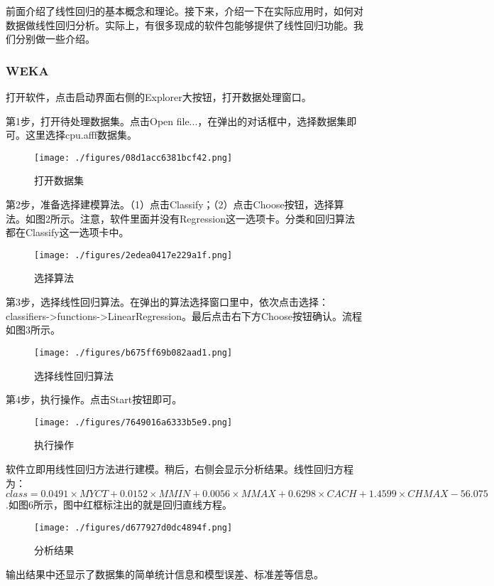 前面介绍了线性回归的基本概念和理论。接下来，介绍一下在实际应用时，如何对数据做线性回归分析。实际上，有很多现成的软件包能够提供了线性回归功能。我们分别做一些介绍。

\subsubsection{WEKA}


打开软件，点击启动界面右侧的Explorer大按钮，打开数据处理窗口。

第1步，打开待处理数据集。点击Open file...，在弹出的对话框中，选择数据集即可。这里选择cpu.afff数据集。
\begin{figure}[ht]
\centering
\texttt{[image: ./figures/08d1acc6381bcf42.png]}
\caption{打开数据集} \label{fig_LiGr_5}
\end{figure}

第2步，准备选择建模算法。（1）点击Classify；（2）点击Choose按钮，选择算法。如图2所示。注意，软件里面并没有Regression这一选项卡。分类和回归算法都在Classify这一选项卡中。
\begin{figure}[ht]
\centering
\texttt{[image: ./figures/2edea0417e229a1f.png]}
\caption{选择算法} \label{fig_LiGr_2}
\end{figure}

第3步，选择线性回归算法。在弹出的算法选择窗口里中，依次点击选择：classifiers->functions->LinearRegression。最后点击右下方Choose按钮确认。流程如图3所示。
\begin{figure}[ht]
\centering
\texttt{[image: ./figures/b675ff69b082aad1.png]}
\caption{选择线性回归算法} \label{fig_LiGr_3}
\end{figure}

第4步，执行操作。点击Start按钮即可。
\begin{figure}[ht]
\centering
\texttt{[image: ./figures/7649016a6333b5e9.png]}
\caption{执行操作} \label{fig_LiGr_4}
\end{figure}

软件立即用线性回归方法进行建模。稍后，右侧会显示分析结果。线性回归方程为：$class=0.0491 \times MYCT+0.0152 \times MMIN+0.0056 \times MMAX+0.6298 \times CACH+1.4599 \times CHMAX-56.075$.如图6所示，图中红框标注出的就是回归直线方程。
\begin{figure}[ht]
\centering
\texttt{[image: ./figures/d677927d0dc4894f.png]}
\caption{分析结果} \label{fig_LiGr_6}
\end{figure}
输出结果中还显示了数据集的简单统计信息和模型误差、标准差等信息。